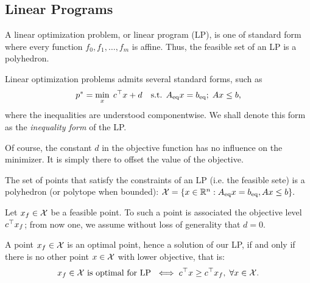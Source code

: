 \documentclass[11 pt]{scrartcl}
\newcommand{\eq}{\text{eq}}
\begin{document}
\subsection{Linear Programs}

\begin{definition}
    A linear optimization problem, or linear program (LP), is one of standard form where every function $f_0, f_1, \dots, f_m$ is affine. 
    Thus, the feasible set of an LP is a polyhedron. 

    Linear optimization problems admits several standard forms, such as 
    \[ p^* = \min_x\; c^\T x + d\quad \text{s.t. }A_{\eq}x = b_{\eq};\; Ax\leq b,\] 
    where the inequalities are understood componentwise. 
    We shall denote this form as the \emph{inequality form} of the LP. 
\end{definition}

Of course, the constant $d$ in the objective function has no influence on the minimizer. 
It is simply there to offset the value of the objective.

The set of points that satisfy the constraints of an LP (i.e. the feasible sete) is a polyhedron (or polytope when bounded): $\Xcal = \{x\in \RR^n : A_{\eq}x = b_{\eq}, Ax\leq b\}.$ 

Let $x_f \in \mathcal X$ be a feasible point. 
To such a point is associated the objective level $c^\top x_f$; from now one, we assume without loss of generality that $d = 0$. 

A point $x_f\in \mathcal X$ is an optimal point, hence a solution of our LP, if and only if there is no other point $x\in \mathcal X$ with lower objective, that is: 
\[ x_f \in \mathcal X \text{ is optimal for LP } \iff c^\top x\geq c^\top x_f, \; \forall x\in \mathcal X.\] 
\end{document}
